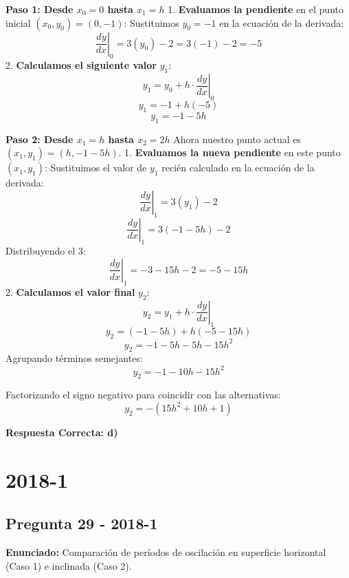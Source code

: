 \documentclass{article}
\begin{document}
\textbf{Paso 1: Desde $x_0 = 0$ hasta $x_1 = h$}
1.  \textbf{Evaluamos la pendiente} en el punto inicial $(x_0, y_0) = (0, -1)$:
    Sustituimos $y_0 = -1$ en la ecuación de la derivada:
    $$ \left. \frac{dy}{dx} \right|_0 = 3(y_0) - 2 = 3(-1) - 2 = -5 $$
2.  \textbf{Calculamos el siguiente valor} $y_1$:
    $$ y_1 = y_0 + h \cdot \left. \frac{dy}{dx} \right|_0 $$
    $$ y_1 = -1 + h(-5) $$
    $$ y_1 = -1 - 5h $$

\textbf{Paso 2: Desde $x_1 = h$ hasta $x_2 = 2h$}
Ahora nuestro punto actual es $(x_1, y_1) = (h, -1 - 5h)$.
1.  \textbf{Evaluamos la nueva pendiente} en este punto $(x_1, y_1)$:
    Sustituimos el valor de $y_1$ recién calculado en la ecuación de la derivada:
    $$ \left. \frac{dy}{dx} \right|_1 = 3(y_1) - 2 $$
    $$ \left. \frac{dy}{dx} \right|_1 = 3(-1 - 5h) - 2 $$
    Distribuyendo el 3:
    $$ \left. \frac{dy}{dx} \right|_1 = -3 - 15h - 2 = -5 - 15h $$
2.  \textbf{Calculamos el valor final} $y_2$:
    $$ y_2 = y_1 + h \cdot \left. \frac{dy}{dx} \right|_1 $$
    $$ y_2 = (-1 - 5h) + h(-5 - 15h) $$
    $$ y_2 = -1 - 5h - 5h - 15h^2 $$
    Agrupando términos semejantes:
    $$ y_2 = -1 - 10h - 15h^2 $$

Factorizando el signo negativo para coincidir con las alternativas:
$$ y_2 = -(15h^2 + 10h + 1) $$

\noindent{}


\textbf{Respuesta Correcta: d)}

\vspace{0.5cm}

\section{2018-1}

\subsection*{Pregunta 29 - 2018-1}
\textbf{Enunciado:} Comparación de períodos de oscilación en superficie horizontal (Caso 1) e inclinada (Caso 2).
\end{document}
